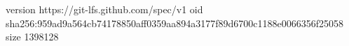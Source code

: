 version https://git-lfs.github.com/spec/v1
oid sha256:959ad9a564cb74178850aff0359aa894a3177f89d6700c1188e0066356f25058
size 1398128
